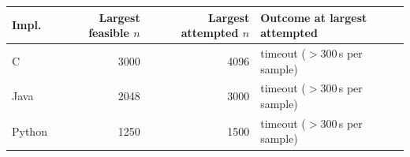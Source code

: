 \begin{tabular}{lrrl}
\toprule
Impl. & Largest feasible $n$ & Largest attempted $n$ & Outcome at largest attempted \\
\midrule
C & 3000 & 4096 & timeout ($>$300\,s per sample) \\
Java & 2048 & 3000 & timeout ($>$300\,s per sample) \\
Python & 1250 & 1500 & timeout ($>$300\,s per sample) \\
\bottomrule
\end{tabular}
